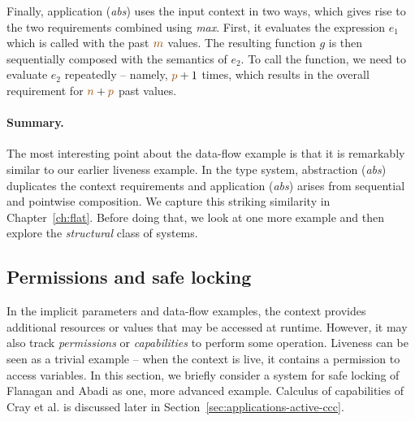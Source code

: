 Finally, application (\emph{abs}) uses the input context in two ways, which gives rise to the
two requirements combined using \emph{max}. First, it evaluates the expression $e_1$ which is 
called with the past $\aclrd{m}$ values. The resulting function $g$ is then sequentially composed
with the semantics of $e_2$. To call the function, we need to evaluate $e_2$ repeatedly -- namely,
$\aclrd{p}+1$ times, which results in the overall requirement for $\aclrd{n}+\aclrd{p}$ past values.

\paragraph{Summary.}
The most interesting point about the data-flow example is that it is remarkably similar to our
earlier liveness example. In the type system, abstraction (\emph{abs}) duplicates the context
requirements and application (\emph{abs}) arises from sequential and pointwise composition.
We capture this striking similarity in Chapter~\ref{ch:flat}. Before doing that, we look at one
more example and then explore the \emph{structural} class of systems.


\subsection{Permissions and safe locking}
In the implicit parameters and data-flow examples, the context provides additional resources or 
values that may be accessed at runtime. However, it may also track \emph{permissions} or 
\emph{capabilities} to perform some operation. Liveness can be seen as a trivial example -- when
the context is live, it contains a permission to access variables. In this section, we briefly
consider a system for safe locking of Flanagan and Abadi \cite{app-safe-locking} as one, more
advanced example. Calculus of capabilities of Cray et al. \cite{app-capabilities} is discussed 
later in Section~\ref{sec:applications-active-ccc}.

